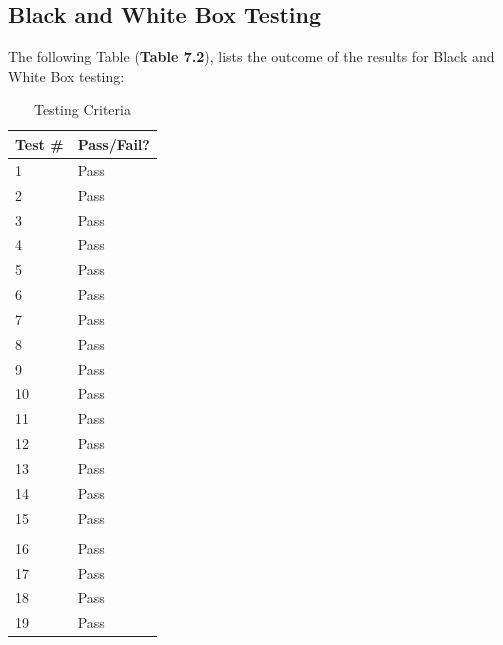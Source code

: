 \documentclass[oneside]{report}
\begin{document}
		\subsection{Black and White Box Testing}
		
		The following Table (\textbf{Table 7.2}), lists the outcome of the results for Black and White Box testing:
		
		\begin{table}[H]
		\centering
		\caption{Testing Criteria}
		\begin{tabular}{|l|l|} 
		\hline
		Test \# & Pass/Fail? \\ 
		\hline
		1 & Pass \\ 
		\hline
		2 & Pass \\ 
		\hline
		3 & Pass \\ 
		\hline
		4 & Pass \\ 
		\hline
		5 & Pass \\ 
		\hline
		6 & Pass \\ 
		\hline
		7 & Pass \\ 
		\hline
		8 & Pass \\ 
		\hline
		9 & Pass \\ 
		\hline
		10 & Pass \\ 
		\hline
		11 & Pass \\ 
		\hline
		12~ & Pass \\ 
		\hline
		13 & Pass \\ 
		\hline
		14 & Pass \\ 
		\hline
		15~ & Pass \\ 
		\hline
		\multicolumn{2}{|l|}{} \\ 
		\hline
		16 & Pass \\ 
		\hline
		17 & Pass \\ 
		\hline
		18 & Pass \\ 
		\hline
		19 & Pass \\
		\hline
		\end{tabular}
		\end{table}
		
\end{document}

